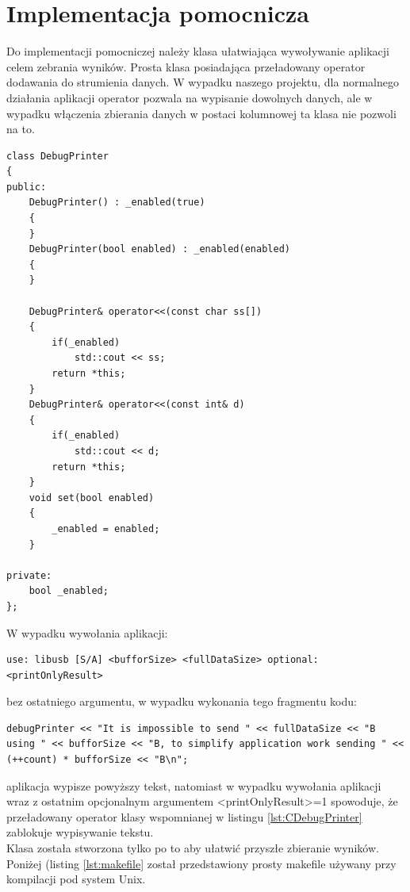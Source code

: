 \documentclass{BscUS}
\begin{document}
\section{Implementacja pomocnicza}
\label{sch:additionalImplementation}
Do implementacji pomocniczej należy klasa ułatwiająca wywoływanie aplikacji celem zebrania wyników. Prosta klasa posiadająca przeładowany operator dodawania do strumienia danych. W wypadku naszego projektu, dla normalnego działania aplikacji operator pozwala na wypisanie dowolnych danych, ale w wypadku włączenia zbierania danych w postaci kolumnowej ta klasa nie pozwoli na to.

\begin{lstlisting}[caption={Klasa DebugPrinter},label={lst:CDebugPrinter}]
class DebugPrinter
{
public:
	DebugPrinter() : _enabled(true)
	{
	}
	DebugPrinter(bool enabled) : _enabled(enabled)
	{
	}
	
	DebugPrinter& operator<<(const char ss[])
	{
		if(_enabled)
			std::cout << ss;
		return *this;
	}
	DebugPrinter& operator<<(const int& d)
	{
		if(_enabled)
			std::cout << d;
		return *this;
	}
	void set(bool enabled)
	{
		_enabled = enabled;
	}

private:
	bool _enabled;
};
\end{lstlisting}
W wypadku wywołania aplikacji:
\begin{lstlisting}[caption={Uruchomienie testu}]
use: libusb [S/A] <bufforSize> <fullDataSize> optional:<printOnlyResult>
\end{lstlisting}
bez ostatniego argumentu, w wypadku wykonania tego fragmentu kodu: 
\begin{lstlisting}[caption={Wypisywanie w zależności od argumentu wywołania aplikacji}]
debugPrinter << "It is impossible to send " << fullDataSize << "B using " << bufforSize << "B, to simplify application work sending " << (++count) * bufforSize << "B\n";
\end{lstlisting}
aplikacja wypisze powyższy tekst, natomiast w wypadku wywołania aplikacji wraz z ostatnim opcjonalnym argumentem <printOnlyResult>=1 spowoduje, że przeładowany operator klasy wspomnianej w listingu \ref{lst:CDebugPrinter} zablokuje wypisywanie tekstu. \\
Klasa została stworzona tylko po to aby ułatwić przyszłe zbieranie wyników.
\newline
\newline
Poniżej (listing \ref{lst:makefile} został przedstawiony prosty makefile używany przy kompilacji pod system Unix.
\end{document}
